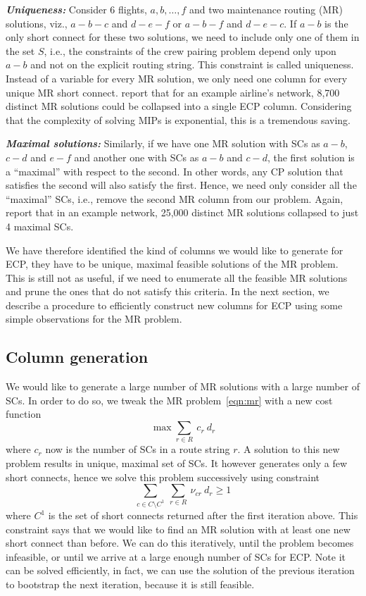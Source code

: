 \documentclass[letterpaper, 10pt, twocolumn, reqno]{amsart}
\begin{document}
\textbf{\emph{Uniqueness:}} Consider 6 flights, $a, b, \ldots, f$ and two maintenance routing (MR) solutions, viz., $a-b-c$ and $d-e-f$ or $a-b-f$ and $d-e-c$. If $a-b$ is the only short connect for these two solutions, we need to include only one of them in the set $S$, i.e., the constraints of the crew pairing problem depend only upon $a-b$ and not on the explicit routing string. This constraint is called uniqueness. Instead of a variable for every MR solution, we only need one column for every unique MR short connect. \cite{cohn2003improving} report that for an example airline's network, 8,700 distinct MR solutions could be collapsed into a single ECP column. Considering that the complexity of solving MIPs is exponential, this is a tremendous saving.

\textbf{\emph{Maximal solutions:}} Similarly, if we have one MR solution with SCs as $a-b$, $c-d$ and $e-f$ and another one with SCs as $a-b$ and $c-d$, the first solution is a ``maximal'' with respect to the second. In other words, any CP solution that satisfies the second will also satisfy the first. Hence, we need only consider all the ``maximal'' SCs, i.e., remove the second MR column from our problem. Again,~\cite{cohn2003improving} report that in an example network, 25,000 distinct MR solutions collapsed to just 4 maximal SCs.

We have therefore identified the kind of columns we would like to generate for ECP, they have to be unique, maximal feasible solutions of the MR problem. This is still not as useful, if we need to enumerate all the feasible MR solutions and prune the ones that do not satisfy this criteria. In the next section, we describe a procedure to efficiently construct new columns for ECP using some simple observations for the MR problem.

\subsection{Column generation}
\label{ssec:col_gen_ecp}

We would like to generate a large number of MR solutions with a large number of SCs. In order to do so, we tweak the MR problem~\eqref{eqn:mr} with a new cost function
$$
\max \sum_{r \in R}\ c_r\ d_r
$$
where $c_r$ now is the number of SCs in a route string $r$. A solution to this new problem results in unique, maximal set of SCs. It however generates only a few short connects, hence we solve this problem successively using constraint
$$
\sum_{c \in C\setminus C^1}\ \sum_{r \in R}\ \nu_{cr}\ d_r \geq 1
$$
where $C^1$ is the set of short connects returned after the first iteration above. This constraint says that we would like to find an MR solution with at least one new short connect than before. We can do this iteratively, until the problem becomes infeasible, or until we arrive at a large enough number of SCs for ECP. Note it can be solved efficiently, in fact, we can use the solution of the previous iteration to bootstrap the next iteration, because it is still feasible.
\end{document}

